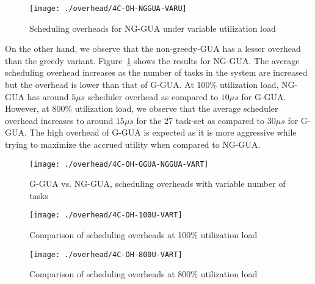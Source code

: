 \documentclass[12pt,dvips]{report}
\begin{document}
\begin{figure} [htbp]
  \centering
  \texttt{[image: ./overhead/4C-OH-NGGUA-VARU]}
  \caption{Scheduling overheads for NG-GUA under variable utilization load}
  \label{fig:4C-OH-NGGUA-VARU}
\end{figure}

On the other hand, we observe that the non-greedy-GUA has a lesser overhead than the greedy variant. Figure~\ref{fig:4C-OH-NGGUA-VARU} shows the results for NG-GUA. The average scheduling overhead increases as the number of tasks in the system are increased but the overhead is lower than that of G-GUA. At 100\% utilization load, NG-GUA has around $5 \mu s$ scheduler overhead as compared to $10 \mu s$ for G-GUA. However, at 800\% utilization load, we observe that the average scheduler overhead increases to around $15 \mu s$ for the 27 task-set as compared to $30 \mu s$ for G-GUA. The high overhead of G-GUA is expected as it is more aggressive while trying to maximize the accrued utility when compared to NG-GUA.

%

\begin{figure} [htbp]
  \centering
  \texttt{[image: ./overhead/4C-OH-GGUA-NGGUA-VART]}
  \caption{G-GUA vs. NG-GUA, scheduling overheads with variable number of tasks}
  \label{fig:4C-OH-GGUA-NGGUA-VART}
\end{figure}

\begin{figure}[htbp]
  \centering
  \texttt{[image: ./overhead/4C-OH-100U-VART]}
  \caption{Comparison of scheduling overheads at 100\% utilization load}
  \label{fig:4C-OH-100U-VART}
\end{figure}

\begin{figure}[htbp]
  \centering
  \texttt{[image: ./overhead/4C-OH-800U-VART]}
  \caption{Comparison of scheduling overheads at 800\% utilization load}
  \label{fig:4C-OH-800U-VART}
\end{figure}
\end{document}
